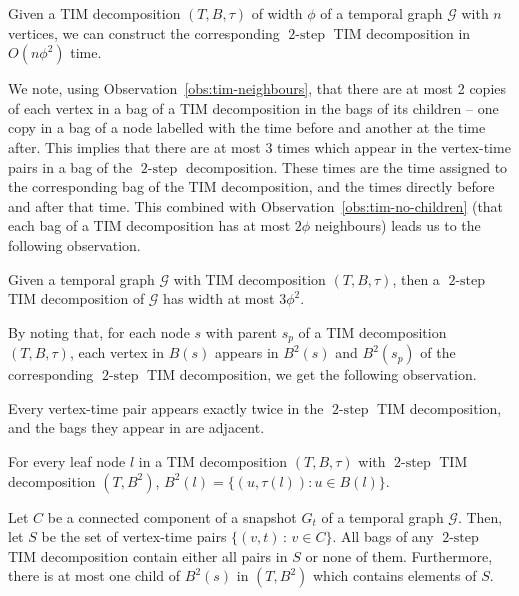 \documentclass[a4paper,UKenglish,cleveref, autoref, thm-restate]{lipics-v2021} %
\DeclareMathOperator{\twostep}{2-step}
\begin{document}
\begin{toappendix}
\begin{observation}
    Given a TIM decomposition $(T,B,\tau)$ of width $\phi$ of a temporal graph $\mathcal{G}$ with $n$ vertices, we can construct the corresponding $\twostep$ TIM decomposition in $O(n\phi^2)$ time.
\end{observation}
We note, using Observation~\ref{obs:tim-neighbours}, that there are at most 2 copies of each vertex in a bag of a TIM decomposition in the bags of its children -- one copy in a bag of a node labelled with the time before and another at the time after. This implies that there are at most 3 times which appear in the vertex-time pairs in a bag of the $\twostep$ decomposition. These times are the time assigned to the corresponding bag of the TIM decomposition, and the times directly before and after that time. This combined with Observation~\ref{obs:tim-no-children} (that each bag of a TIM decomposition has at most $2\phi$ neighbours) leads us to the following observation.
\begin{observation}\label{obs:two-step-width}
    Given a temporal graph $\mathcal{G}$ with TIM decomposition $(T,B,\tau)$, then a $\twostep$ TIM decomposition of $\mathcal{G}$ has width at most $3\phi^2$. 
\end{observation}

By noting that, for each node $s$ with parent $s_p$ of a TIM decomposition $(T,B,\tau)$, each vertex in $B(s)$ appears in $B^2(s)$ and $B^2(s_p)$ of the corresponding $\twostep$ TIM decomposition, we get the following observation.

\begin{observation}
    Every vertex-time pair appears exactly twice in the $\twostep$ TIM decomposition, and the bags they appear in are adjacent. 
\end{observation}

\begin{observation}\label{obs:2-step-leaves}
    For every leaf node $l$ in a TIM decomposition $(T,B,\tau)$ with $\twostep$ TIM decomposition $(T,B^2)$, $B^2(l)=\{(u,\tau(l)) : u\in B(l)\}$.
\end{observation}
\begin{observation}\label{obs:two-step-component-in-children}
    Let $C$ be a connected component of a snapshot $G_t$ of a temporal graph $\mathcal{G}$. Then, let $S$ be the set of vertex-time pairs $\{(v,t) \,:\, v\in C\}$. All bags of any $\twostep$ TIM decomposition contain either all pairs in $S$ or none of them.
    Furthermore, there is at most one child of $B^2(s)$ in $(T,B^2)$ which contains elements of $S$.
\end{observation}



\end{toappendix}
\end{document}
